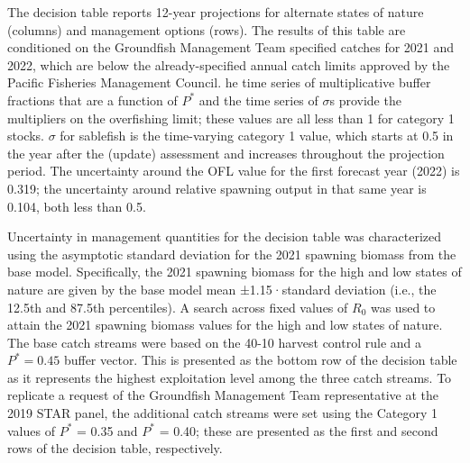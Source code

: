 \documentclass[11pt,
  english,
  a4paper,
]{article}
\begin{document}
\leavevmode\tagmcend\tagstructend


The decision table reports 12-year projections for alternate states of nature (columns) and management options (rows). The results of this table are conditioned on the Groundfish Management Team specified catches for 2021 and 2022, which are below the already-specified annual catch limits approved by the Pacific Fisheries Management Council. he time series of multiplicative buffer fractions that are a function of {\(P^*\)\leavevmode\tagmcend\tagstructend} and the time series of {\(\sigma\)\leavevmode\tagmcend\tagstructend}s provide the multipliers on the overfishing limit; these values are all less than 1 for category 1 stocks. {\(\sigma\)\leavevmode\tagmcend\tagstructend} for sablefish is the time-varying category 1 value, which starts at 0.5 in the year after the (update) assessment and increases throughout the projection period. The uncertainty around the OFL value for the first forecast year (2022) is 0.319; the uncertainty around relative spawning output in that same year is 0.104, both less than 0.5.

\leavevmode\tagmcend\tagstructend\par


Uncertainty in management quantities for the decision table was characterized using the asymptotic standard deviation for the 2021 spawning biomass from the base model. Specifically, the 2021 spawning biomass for the high and low states of nature are given by the base model mean ±1.15·standard deviation (i.e., the 12.5th and 87.5th percentiles). A search across fixed values of {\(R_0\)\leavevmode\tagmcend\tagstructend} was used to attain the 2021 spawning biomass values for the high and low states of nature. The base catch streams were based on the 40-10 harvest control rule and a {\(P^*= 0.45\)\leavevmode\tagmcend\tagstructend} buffer vector. This is presented as the bottom row of the decision table as it represents the highest exploitation level among the three catch streams. To replicate a request of the Groundfish Management Team representative at the 2019 STAR panel, the additional catch streams were set using the Category 1 values of {\(P^*\)\leavevmode\tagmcend\tagstructend} = 0.35 and {\(P^*\)\leavevmode\tagmcend\tagstructend} = 0.40; these are presented as the first and second rows of the decision table, respectively.
\end{document}
